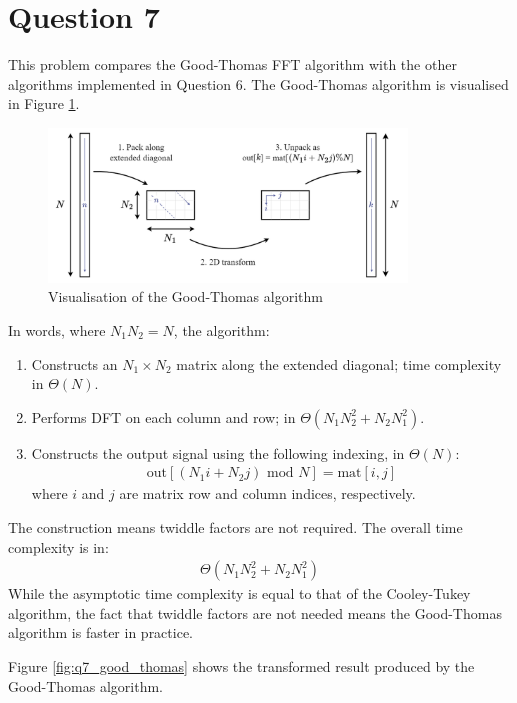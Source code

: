\section*{Question 7}

This problem compares the Good-Thomas FFT algorithm with the other algorithms implemented in Question 6. The Good-Thomas algorithm is visualised in Figure \ref{fig:q7_viz_good_thomas}.

\begin{figure}[ht]
    \centering
    \includegraphics[width=0.85\textwidth]{images/q7_viz_good_thomas.png}
    \caption{Visualisation of the Good-Thomas algorithm}
    \label{fig:q7_viz_good_thomas}
\end{figure}

In words, where $N_1N_2=N$, the algorithm:
\begin{enumerate}
    \item Constructs an $N_1\times N_2$ matrix along the extended diagonal; time complexity in $\Theta(N)$.
    \item Performs DFT on each column and row; in $\Theta(N_1N_2^2 + N_2N_1^2)$.
    \item Constructs the output signal using the following indexing, in $\Theta(N)$:
    \begin{align*}
        \text{out}[(N_1 i + N_2 j) \text{ mod } N] = \text{mat}[i,j]
    \end{align*}
    where $i$ and $j$ are matrix row and column indices, respectively.
\end{enumerate}
The construction means twiddle factors are not required. The overall time complexity is in:
\begin{align}
    \Theta(N_1N_2^2 + N_2N_1^2)
\end{align}
While the asymptotic time complexity is equal to that of the Cooley-Tukey algorithm, the fact that twiddle factors are not needed means the Good-Thomas algorithm is faster in practice.

Figure \ref{fig:q7_good_thomas} shows the transformed result produced by the Good-Thomas algorithm.

